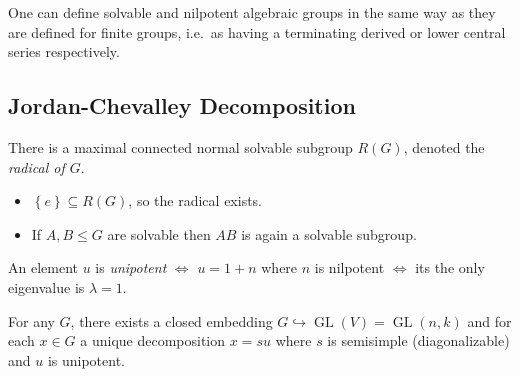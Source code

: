 \begin{proposition}[?]

\begin{proposition}[?]

One can define solvable and nilpotent algebraic groups in the same way
as they are defined for finite groups, i.e.~as having a terminating
derived or lower central series respectively.

\end{proposition}

\end{proposition}

\hypertarget{jordan-chevalley-decomposition}{%
\subsection{Jordan-Chevalley
Decomposition}\label{jordan-chevalley-decomposition}}

\begin{proposition}

\begin{proposition}

There is a maximal connected normal solvable subgroup \(R(G)\), denoted
the \emph{radical of \(G\)}.

\begin{itemize}
\tightlist
\item
  \(\left\{{e}\right\} \subseteq R(G)\), so the radical exists.
\item
  If \(A, B \leq G\) are solvable then \(AB\) is again a solvable
  subgroup.
\end{itemize}

\end{proposition}

\end{proposition}

\begin{definition}[Unipotent]

\begin{definition}[Unipotent]

An element \(u\) is \emph{unipotent} \(\iff\) \(u = 1+n\) where \(n\) is
nilpotent \(\iff\) its the only eigenvalue is \(\lambda = 1\).

\end{definition}

\end{definition}

\begin{proposition}[JC Decomposition]

\begin{proposition}[JC Decomposition]

For any \(G\), there exists a closed embedding
\(G\hookrightarrow\operatorname{GL}(V) = \operatorname{GL}(n , k)\) and
for each \(x\in G\) a unique decomposition \(x=su\) where \(s\) is
semisimple (diagonalizable) and \(u\) is unipotent.

\end{proposition}

\end{proposition}

